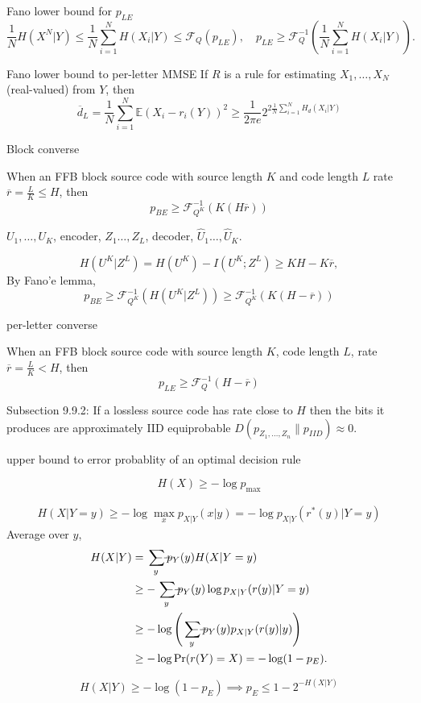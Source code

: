 \documentclass{report}
\newcommand{\matE}{\mathbb{E}}
\def \ssumsym {\mathrlap{\ \ --}\sum}
\DeclareMathOperator*{\ssum}{\ssumsym}
\theoremstyle{definition}
\theoremstyle{remark}
\numberwithin{equation}{section}
\begin{document}
Fano lower bound for $p_{LE}$ \[
\frac{1}{N}H(X^N|Y) \leq \frac{1}{N}\sum_{i=1}^N H(X_i|Y) \leq \mathscr{F}_Q(p_{LE}),\quad p_{LE} \geq \mathscr{F}_Q^{-1}\left(\frac{1}{N}\sum_{i=1}^N H(X_i|Y)\right).
\]

Fano lower bound to per-letter MMSE
If $R$ is a rule for estimating $X_1, \ldots, X_N$ (real-valued) from $Y$, then \[
\overline{d}_L = \frac{1}{N}\sum_{i=1}^N \matE(X_i - r_i(Y))^2 \geq \frac{1}{2\pi e}2^{2\frac{1}{N}\sum_{i=1}^N H_d(X_i|Y)}  
\]

Block converse

When an FFB block source code with source length $K$ and code length $L$ rate $\overline{r} = \frac{L}{K} \leq H$, then \[p_{BE} \geq \mathscr{F}_{Q^K}^{-1}(K(H\overline{r}))\]

$U_1, \ldots, U_K$, encoder, $Z_1 \ldots, Z_L$, decoder, $\hat{U}_1 \ldots, \hat{U}_K$.

\[
H(U^K|Z^L) = H(U^K) - I(U^K;Z^L) \geq KH - K\overline{r},  
\] By Fano'e lemma, \[p_{BE} \geq \mathscr{F}_{Q^K}^{-1}\left(H(U^K|Z^L)\right) \geq \mathscr{F}_{Q^K}^{-1}(K(H - \overline{r}))\]

per-letter converse

When an FFB block source code with source length $K$, code length $L$, rate $\overline{r}=\frac{L}{K} < H$, then \[p_{LE} \geq \mathscr{F}_Q^{-1}(H - \overline{r})\]

Subsection 9.9.2: If a lossless source code has rate close to $H$ then the bits it produces are approximately IID equiprobable $D(p_{Z_1, \ldots, Z_n}\| p_{IID}) \approx 0$.


upper bound to error probablity of an optimal decision rule

\[H(X) \geq - \log p_{\max}\]

\begin{align*}
  H(X|Y=y) \geq - \log \max_{x} p_{X|Y}(x|y) = -\log p_{X|Y}(r^*(y)|Y = y)
\end{align*}
Average over $y$, \begin{align*}
  H(X|Y) & = \ssum_y p_Y(y) H(X|Y = y) \\
  & \geq - \ssum_y p_Y(y) \log p_{X|Y}(r(y)|Y = y) \\
  & \geq - \log \left(\ssum_y p_Y(y)p_{X|Y}(r(y)|y)\right) \\
  & \geq - \log \Pr(r(Y) = X) = - \log (1 - p_E).
\end{align*}

\[H(X|Y) \geq - \log(1 - p_E) \implies p_E \leq 1 - 2^{-H(X|Y)}\]
\end{document}

